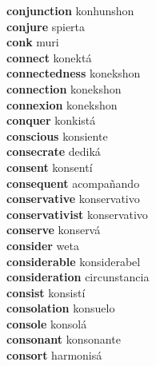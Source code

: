 \textbf{conjunction } konhunshon \\
\textbf{conjure } spierta \\
\textbf{conk } muri \\
\textbf{connect } konektá \\
\textbf{connectedness } konekshon \\
\textbf{connection } konekshon \\
\textbf{connexion } konekshon \\
\textbf{conquer } konkistá \\
\textbf{conscious } konsiente \\
\textbf{consecrate } dediká \\
\textbf{consent } konsentí \\
\textbf{consequent } acompañando \\
\textbf{conservative } konservativo \\
\textbf{conservativist } konservativo \\
\textbf{conserve } konservá \\
\textbf{consider } weta \\
\textbf{considerable } konsiderabel \\
\textbf{consideration } circunstancia \\
\textbf{consist } konsistí \\
\textbf{consolation } konsuelo \\
\textbf{console } konsolá \\
\textbf{consonant } konsonante \\
\textbf{consort } harmonisá \\
